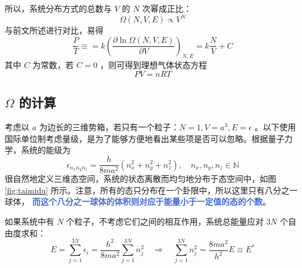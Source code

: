 所以，系统分布方式的总数与 $V$ 的 $N$ 次幂成正比：
\begin{equation}
    \Omega(N,V,E) \propto V^N
\end{equation}
与前文所述进行对比，易得
\begin{equation}
    \frac{P}{T} \equiv = k \left(\frac{\partial \ln\Omega(N,V,E)}{\partial V}\right)_{N,E} = k\frac{N}{V} + C
\end{equation}
其中 $C$ 为常数，若 $C= 0$ ，则可得到理想气体状态方程
\begin{equation}
    PV = nRT
\end{equation}

\subsection{$\Omega$ 的计算}

考虑以 $a$ 为边长的三维势箱，若只有一个粒子：$N =1,V = a^3, E = \epsilon$ 。以下使用国际单位制考虑量级，是为了能够方便地看出某些项是否可以忽略。根据量子力学，系统的能级为
\begin{equation}
    \epsilon_{n_xn_yn_z} = \frac{h}{8ma^2} (n_x^2 + n_y^2 + n_z^2), \quad n_x, n_y, n_z\in \mathbb{N}
\end{equation}
很自然地定义三维态空间，系统的状态离散而均匀地分布于态空间中，如图 \ref{fig:taimidu} 所示。注意，所有的态只分布在一个卦限中，所以这里只有八分之一球体， \textcolor{RoyalBlue}{\textbf{\kaishu  而这个八分之一球体的体积则对应于能量小于一定值的态的个数}}。

如果系统中有 $N$ 个粒子，不考虑它们之间的相互作用，系统总能量应对 $3N$ 个自由度求和：
\begin{equation}\label{equ:qiu}
    E = \sum_{j=1}^{3 N} \epsilon_i=\frac{ h^2}{8 m a^2} \sum_{j=1}^{3 N} n_j^2 \quad \Longrightarrow  \quad \sum_{j=1}^{3 N} n_j^2 = \frac{8ma^2}{h^2} E\equiv E^*
\end{equation}


